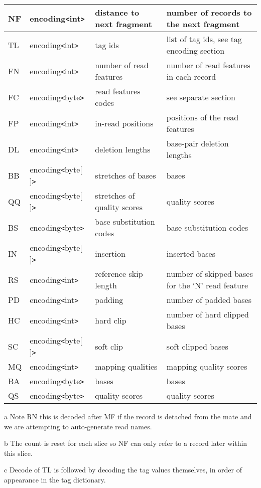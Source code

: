 \documentclass[a4paper]{article}
\begin{document}
\begin{threeparttable}[t]
\begin{tabular}{|l|l|>{\raggedright}p{100pt}|>{\raggedright}p{220pt}|}
\hline
NF & encoding\texttt{<}int\texttt{>} & distance to next fragment & number of records
to the next fragment\tnote{b}\tabularnewline
\hline
TL\tnote{c} & encoding\texttt{<}int\texttt{>} & tag ids  & list of tag ids, see tag encoding
section\tabularnewline
\hline
FN & encoding\texttt{<}int\texttt{>} & number of read features & number of read
features in each record\tabularnewline
\hline
FC & encoding\texttt{<}byte\texttt{>} & read features codes & see separate section\tabularnewline
\hline
FP & encoding\texttt{<}int\texttt{>} & in-read positions & positions of the read
features\tabularnewline
\hline
DL & encoding\texttt{<}int\texttt{>} & deletion lengths & base-pair deletion lengths\tabularnewline
\hline
BB & encoding\texttt{<}byte[ ]\texttt{>} & stretches of bases & bases\tabularnewline
\hline
QQ & encoding\texttt{<}byte[ ]\texttt{>} & stretches of quality scores & quality scores\tabularnewline
\hline
BS & encoding\texttt{<}byte\texttt{>} & base substitution codes & base substitution
codes\tabularnewline
\hline
IN & encoding\texttt{<}byte[ ]\texttt{>} & insertion & inserted bases\tabularnewline
\hline
RS & encoding\texttt{<}int\texttt{>} & reference skip length & number of skipped 
bases for the `N' read feature\tabularnewline
\hline
PD & encoding\texttt{<}int\texttt{>} & padding & number of padded bases\tabularnewline
\hline
HC & encoding\texttt{<}int\texttt{>} & hard clip & number of hard clipped bases\tabularnewline
\hline
SC & encoding\texttt{<}byte[ ]\texttt{>} & soft clip & soft clipped bases\tabularnewline
\hline
MQ & encoding\texttt{<}int\texttt{>} & mapping qualities & mapping quality scores\tabularnewline
\hline
BA & encoding\texttt{<}byte\texttt{>} & bases & bases\tabularnewline
\hline
QS & encoding\texttt{<}byte\texttt{>} & quality scores & quality scores\tabularnewline
\hline
\end{tabular}

\begin{tablenotes}
\item[a] Note RN this is decoded after MF if the record is detached from the mate and we are attempting to auto-generate read names.
\item[b] The count is reset for each slice so NF can only refer to a record later within this slice.
\item[c] Decode of TL is followed by decoding the tag values themselves, in order of appearance in the tag dictionary.
\end{tablenotes}
\end{threeparttable}
\end{document}
